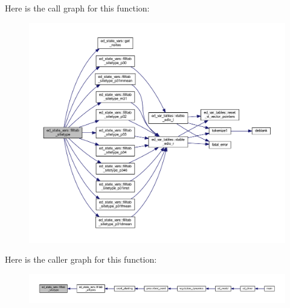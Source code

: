 Here is the call graph for this function\+:\nopagebreak
\begin{figure}[H]
\begin{center}
\leavevmode
\includegraphics[width=350pt]{namespaceed__state__vars_adfda51c18d9eb4eab6a5f2d479eccd29_cgraph}
\end{center}
\end{figure}




Here is the caller graph for this function\+:\nopagebreak
\begin{figure}[H]
\begin{center}
\leavevmode
\includegraphics[width=350pt]{namespaceed__state__vars_adfda51c18d9eb4eab6a5f2d479eccd29_icgraph}
\end{center}
\end{figure}


